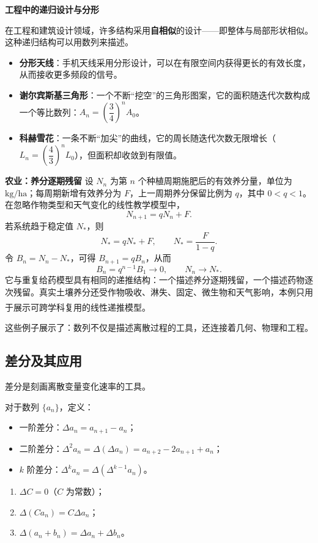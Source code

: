 \documentclass[fontset=fandol]{ctexart}
\newcommand{\upcite}[1]{\textsuperscript{\textsuperscript{\cite{#1}}}}
\begin{document}
\textbf{工程中的递归设计与分形}

在工程和建筑设计领域，许多结构采用\textbf{自相似}的设计——即整体与局部形状相似。这种递归结构可以用数列来描述。

\begin{itemize}
\item \textbf{分形天线}：手机天线采用分形设计，可以在有限空间内获得更长的有效长度，从而接收更多频段的信号。
\item \textbf{谢尔宾斯基三角形}：一个不断“挖空”的三角形图案，它的面积随迭代次数构成一个等比数列：\(A_n = \left(\dfrac{3}{4}\right)^n A_0\)。
\item \textbf{科赫雪花}：一条不断“加尖”的曲线，它的周长随迭代次数无限增长（\(L_n = \left(\dfrac{4}{3}\right)^n L_0\)），但面积却收敛到有限值。
\end{itemize}




\textbf{农业：养分逐期残留}
设 $N_n$ 为第 $n$ 个种植周期施肥后的有效养分量，单位为 $\mathrm{kg/ha}$；每周期新增有效养分为 $F$，上一周期养分保留比例为 $q$，其中 $0<q<1$。在忽略作物类型和天气变化的线性教学模型中，
\[
N_{n+1}=qN_n+F.
\]
若系统趋于稳定值 $N_*$，则
\[
N_*=qN_*+F,\qquad N_*=\frac{F}{1-q}.
\]
令 $B_n=N_n-N_*$，可得 $B_{n+1}=qB_n$，从而
\[
B_n=q^{n-1}B_1\to0,\qquad N_n\to N_*.
\]
它与重复给药模型具有相同的递推结构：一个描述养分逐期残留，一个描述药物逐次残留。真实土壤养分还受作物吸收、淋失、固定、微生物和天气影响，本例只用于展示可跨学科复用的线性递推模型。\upcite{BradyWeil}

这些例子展示了：数列不仅是描述离散过程的工具，还连接着几何、物理和工程。
\subsection{差分及其应用}

差分是刻画离散变量变化速率的工具。

\begin{definition}[差分]
对于数列 \(\{a_n\}\)，定义：
\begin{itemize}
\item 一阶差分：\(\Delta a_n = a_{n+1} - a_n\)；
\item 二阶差分：\(\Delta^2 a_n = \Delta(\Delta a_n) = a_{n+2} - 2a_{n+1} + a_n\)；
\item \(k\) 阶差分：\(\Delta^k a_n = \Delta(\Delta^{k-1} a_n)\)。
\end{itemize}
\end{definition}

\begin{proposition}[差分的性质]
\begin{enumerate}
\item \(\Delta C = 0\)（\(C\) 为常数）；
\item \(\Delta(C a_n) = C \Delta a_n\)；
\item \(\Delta(a_n + b_n) = \Delta a_n + \Delta b_n\)。
\end{enumerate}
\end{proposition}
\end{document}
